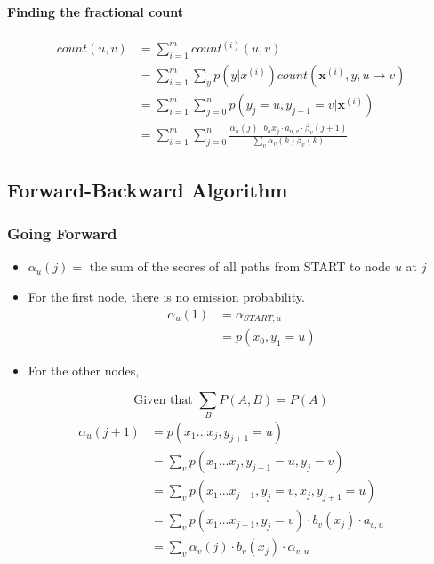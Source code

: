 \documentclass[a4paper]{article}
\begin{document}
\paragraph{Finding the fractional count}

\begin{align*}
	count(u,v) &= \sum_{i=1}^m count^{(i)} (u,v)\\
	&= \sum_{i=1}^m \sum_y p(y|x^{(i)}) count(\textbf{x}^{(i)},y, u \rightarrow v)\\
	&= \sum_{i=1}^m \sum_{j=0}^n p(y_j = u, y_{j+1} = v|\textbf{x}^{(i)})\\
	&= \sum_{i=1}^m \sum_{j=0}^n \frac{\alpha_u(j)\cdot b_u{x_j} \cdot a_{u,v} \cdot \beta_v(j+1)}{\sum_v \alpha_v(k)\beta_v(k)}
\end{align*}

\subsection{Forward-Backward Algorithm}

\subsubsection{Going Forward}
\begin{itemize}
	\item $\alpha_u(j) =$ the sum of the scores of all paths from START to node $u$ at $j$
	\item For the first node, there is no emission probability. 
	\begin{align*}
	\alpha_u(1) &= \alpha_{START,u}\\
	&= p(x_0 , y_1 = u)
	\end{align*}
	\item For the other nodes,
\end{itemize}
$$\text{Given that }\sum_B P(A,B) = P(A)$$
\begin{align*}
\alpha_u(j+1) &= p(x_1 ... x_j, y_{j+1} = u)\\
&= \sum_v p(x_1...x_j, y_{j+1} = u, y_j = v)\\
&= \sum_v p(x_1...x_{j-1}, y_j = v, x_j, y_{j+1}= u)\\
&= \sum_v p(x_1...x_{j-1}, y_j = v) \cdot b_v(x_j) \cdot a_{v,u}\\
&= \sum_v \alpha_v(j) \cdot b_v(x_j)\cdot \alpha_{v,u}
\end{align*}
\newpage
\end{document}

